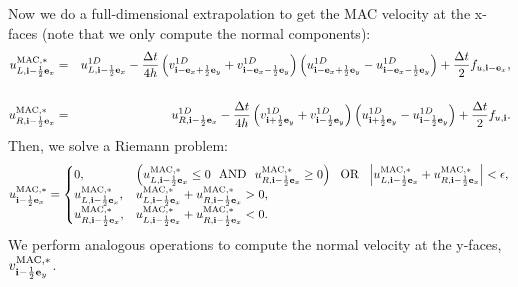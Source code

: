\documentclass[11pt]{article}
\def\half  {\frac{1}{2}}
\def\dt    {\Delta t}
\def\mac   {\rm MAC}
\def\eb    {{\bf e}}
\def\ib    {{\bf i}}
\begin{document}
Now we do a full-dimensional extrapolation to get the MAC velocity at the x-faces (note that we only compute the normal components):
\begin{eqnarray}
u_{L,\ib-\half\eb_x}^{\mac,*} &=& u_{L,\ib-\half\eb_x}^{1D} - \frac{\dt}{4h}\left(v_{\ib-\eb_x+\half\eb_y}^{1D}+v_{\ib-\eb_x-\half\eb_y}^{1D}\right)\left(u_{\ib-\eb_x+\half\eb_y}^{1D} - u_{\ib-\eb_x-\half\eb_y}^{1D}\right) + \frac{\dt}{2}f_{u,\ib-\eb_x}, \nonumber \\
&& \\
u_{R,\ib-\half\eb_x}^{\mac,*} &=& u_{R,\ib-\half\eb_x}^{1D} - \frac{\dt}{4h}\left(v_{\ib+\half\eb_y}^{1D}+v_{\ib-\half\eb_y}^{1D}\right)\left(u_{\ib+\half\eb_y}^{1D} - u_{\ib-\half\eb_y}^{1D}\right) + \frac{\dt}{2}f_{u,\ib}.
\end{eqnarray}
Then, we solve a Riemann problem:
\begin{equation}
u_{\ib-\half\eb_x}^{\mac,*} =
\begin{cases}
0, & \left(u_{L,\ib-\half\eb_x}^{\mac,*} \le 0 ~~ {\rm AND} ~~ u_{R,\ib-\half\eb_x}^{\mac,*} \ge 0\right) ~~ {\rm OR} ~~ \left|u_{L,\ib-\half\eb_x}^{\mac,*} + u_{R,\ib-\half\eb_x}^{\mac,*}\right| < \epsilon, \\
u_{L,\ib-\half\eb_x}^{\mac,*}, & u_{L,\ib-\half\eb_x}^{\mac,*} + u_{R,\ib-\half\eb_x}^{\mac,*} > 0, \\
u_{R,\ib-\half\eb_x}^{\mac,*}, & u_{L,\ib-\half\eb_x}^{\mac,*} + u_{R,\ib-\half\eb_x}^{\mac,*} < 0.
\end{cases}\label{umac Riemann Problem}
\end{equation}
We perform analogous operations to compute the normal velocity at the y-faces, $v^{\mac,*}_{\ib-\half\eb_y}$.
\end{document}
